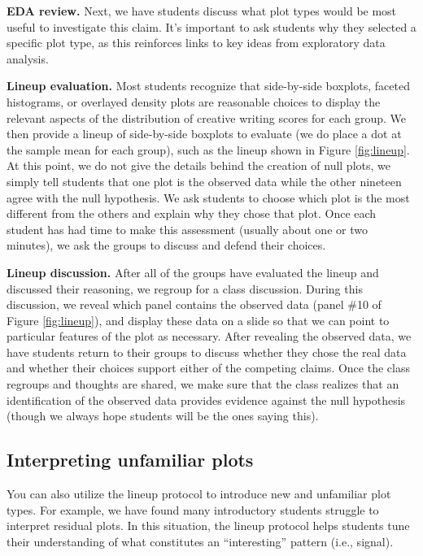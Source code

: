 \documentclass[12pt]{article}
\begin{document}
\textbf{EDA review.} Next, we have students discuss what plot types
would be most useful to investigate this claim. It's important to ask
students why they selected a specific plot type, as this reinforces
links to key ideas from exploratory data analysis.

\textbf{Lineup evaluation.} Most students recognize that side-by-side
boxplots, faceted histograms, or overlayed density plots are reasonable
choices to display the relevant aspects of the distribution of creative
writing scores for each group. We then provide a lineup of side-by-side
boxplots to evaluate (we do place a dot at the sample mean for each
group), such as the lineup shown in Figure \ref{fig:lineup}. At this
point, we do not give the details behind the creation of null plots, we
simply tell students that one plot is the observed data while the other
nineteen agree with the null hypothesis. We ask students to choose which
plot is the most different from the others and explain why they chose
that plot. Once each student has had time to make this assessment
(usually about one or two minutes), we ask the groups to discuss and
defend their choices.

\textbf{Lineup discussion.} After all of the groups have evaluated the
lineup and discussed their reasoning, we regroup for a class discussion.
During this discussion, we reveal which panel contains the observed data
(panel \#10 of Figure \ref{fig:lineup}), and display these data on a
slide so that we can point to particular features of the plot as
necessary. After revealing the observed data, we have students return to
their groups to discuss whether they chose the real data and whether
their choices support either of the competing claims. Once the class
regroups and thoughts are shared, we make sure that the class realizes
that an identification of the observed data provides evidence against
the null hypothesis (though we always hope students will be the ones
saying this).

\hypertarget{interpreting-unfamiliar-plots}{%
\subsection{Interpreting unfamiliar
plots}\label{interpreting-unfamiliar-plots}}

You can also utilize the lineup protocol to introduce new and unfamiliar
plot types. For example, we have found many introductory students
struggle to interpret residual plots. In this situation, the lineup
protocol helps students tune their understanding of what constitutes an
``interesting'' pattern (i.e., signal).
\end{document}
